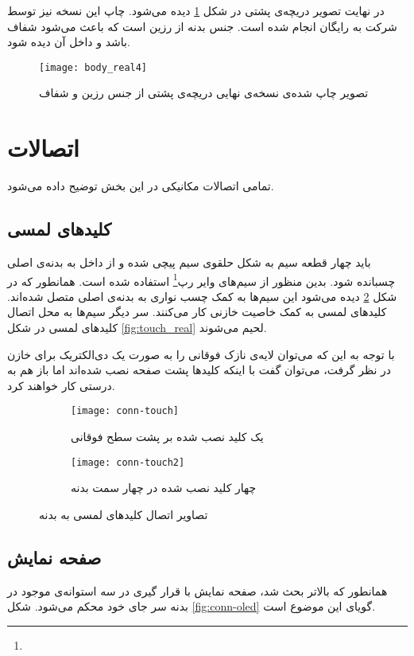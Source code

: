 در نهایت تصویر دریچه‌ی پشتی در شکل \ref{fig:body-back-reel} دیده می‌شود. چاپ این نسخه نیز توسط شرکت \cite{PCBWay} به رایگان انجام شده است. جنس بدنه از رزین است که باعث می‌شود شفاف باشد و داخل آن دیده شود.

	\begin{figure}[h]
		\centering
		\texttt{[image: body\_real4]}
		\caption{تصویر چاپ شده‌ی نسخه‌ی نهایی دریچه‌ی پشتی از جنس رزین و شفاف}
		\label{fig:body-back-reel}
	\end{figure}

\section{اتصالات}
 تمامی اتصالات مکانیکی در این بخش توضیح داده می‌شود.
 
 \subsection{کلیدهای لمسی}
 باید چهار قطعه سیم به شکل حلقوی سیم پیچی شده و از داخل به بدنه‌ی اصلی چسبانده شود. بدین منظور از سیم‌های وایر رپ\footnote{} استفاده شده است. همانطور که در شکل \ref{fig:conn-touch} دیده می‌شود این سیم‌ها به کمک چسب نواری به بدنه‌ی اصلی متصل شده‌اند. کلیدهای لمسی به کمک خاصیت خازنی کار می‌کنند. سر دیگر سیم‌ها به محل اتصال کلیدهای لمسی در شکل \ref{fig:touch_real} لحیم می‌شوند.
 
با توجه به این که می‌توان لایه‌ی نازک فوقانی را به صورت یک دی‌الکتریک برای خازن در نظر گرفت، می‌توان گفت با اینکه کلیدها پشت صفحه نصب شده‌اند اما باز هم به درستی کار خواهند کرد. 

	\begin{figure}[h]
		\centering
		\begin{subfigure}{0.45\textwidth}
			\centering
			\texttt{[image: conn-touch]}
			\caption{یک کلید نصب شده بر پشت سطح فوقانی}
		\end{subfigure} 
		\begin{subfigure}{0.45\textwidth}
			\centering
			\texttt{[image: conn-touch2]}
			\caption{چهار کلید نصب شده در چهار سمت بدنه}
		\end{subfigure}
		\caption{تصاویر اتصال کلیدهای لمسی به بدنه}
		\label{fig:conn-touch}
	\end{figure}

\subsection{صفحه نمایش}
همانطور که بالاتر بحث شد، صفحه نمایش با قرار گیری در سه استوانه‌ی موجود در بدنه سر جای خود محکم می‌شود. شکل \ref{fig:conn-oled} گویای این موضوع است.

